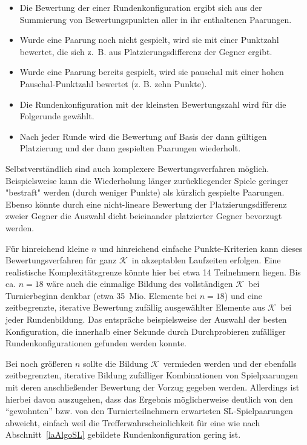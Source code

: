 \documentclass[DIV=15, 10pt]{scrartcl}
\newcommand{\KSet}{$\mathcal{K}$}
\begin{document}
\begin{itemize}

\item Die Bewertung der einer Rundenkonfiguration ergibt sich aus der Summierung von Bewertungspunkten aller in ihr enthaltenen Paarungen.

\item Wurde eine Paarung noch nicht gespielt, wird sie mit einer Punktzahl bewertet, die sich z.~B. aus Platzierungsdifferenz der Gegner ergibt.

\item Wurde eine Paarung bereits gespielt, wird sie pauschal mit einer hohen Pauschal-Punktzahl bewertet (z. B. zehn Punkte).

\item Die Rundenkonfiguration mit der kleinsten Bewertungszahl wird für die Folgerunde gewählt.

\item Nach jeder Runde wird die Bewertung auf Basis der dann gültigen Platzierung und der dann gespielten Paarungen wiederholt.

\end{itemize}

Selbstverständlich sind auch komplexere Bewertungsverfahren möglich. Beispielsweise kann die Wiederholung länger zurückliegender Spiele geringer "bestraft" werden (durch weniger Punkte) als kürzlich gespielte Paarungen. Ebenso könnte durch eine nicht-lineare Bewertung der Platzierungsdifferenz zweier Gegner die Auswahl dicht beieinander platzierter Gegner bevorzugt werden.

Für hinreichend kleine $n$ und hinreichend einfache Punkte-Kriterien kann dieses Bewertungsverfahren für ganz \KSet\ in akzeptablen Laufzeiten erfolgen. Eine realistische Komplexitätsgrenze könnte hier bei etwa 14 Teilnehmern liegen. Bis ca. $n=18$ wäre auch die einmalige Bildung des vollständigen \KSet\ bei Turnierbeginn denkbar (etwa 35~Mio. Elemente bei $n=18$) und eine zeitbegrenzte, iterative Bewertung zufällig ausgewählter Elemente aus \KSet\ bei jeder Rundenbildung. Das entspräche beispielsweise der Auswahl der besten Konfiguration, die innerhalb einer Sekunde durch Durchprobieren zufälliger Rundenkonfigurationen gefunden werden konnte.

Bei noch größeren $n$ sollte die Bildung \KSet\ vermieden werden und der ebenfalls zeitbegrenzten, iterative Bildung zufälliger Kombinationen von Spielpaarungen mit deren anschließender Bewertung der Vorzug gegeben werden. Allerdings ist hierbei davon auszugehen, dass das Ergebnis möglicherweise deutlich von den "`gewohnten"' bzw. von den Turnierteilnehmern erwarteten SL-Spielpaarungen abweicht, einfach weil die Trefferwahrscheinlichkeit für eine wie nach Abschnitt~\ref{laAlgoSL} gebildete Rundenkonfiguration gering ist.
\end{document}
